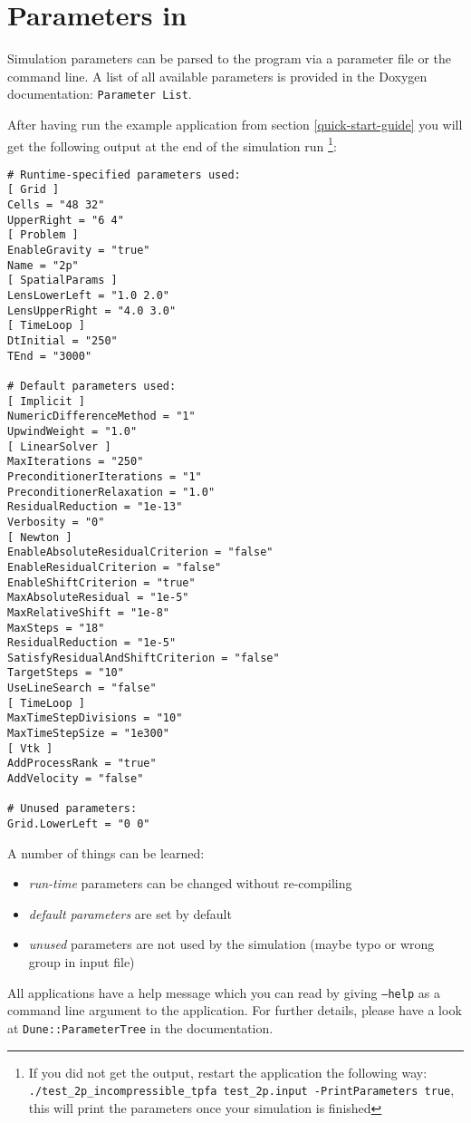 \section{Parameters in \Dumux}
\label{sc_parameterfiles}
Simulation parameters can be parsed to the program via a parameter file or the command line.
A list of all available parameters is provided in the Doxygen documentation: \texttt{Parameter List}.

After having run the example application from section \ref{quick-start-guide} you will
get the following output at the end of the simulation run
\footnote{If you did not get the output, restart the application the following way:
\texttt{./test{\_}2p{\_}incompressible{\_}tpfa test{\_}2p.input -PrintParameters true},
this will print the parameters once your simulation is finished}:
\begin{lstlisting}[style=Bash]
# Runtime-specified parameters used:
[ Grid ]
Cells = "48 32"
UpperRight = "6 4"
[ Problem ]
EnableGravity = "true"
Name = "2p"
[ SpatialParams ]
LensLowerLeft = "1.0 2.0"
LensUpperRight = "4.0 3.0"
[ TimeLoop ]
DtInitial = "250"
TEnd = "3000"

# Default parameters used:
[ Implicit ]
NumericDifferenceMethod = "1"
UpwindWeight = "1.0"
[ LinearSolver ]
MaxIterations = "250"
PreconditionerIterations = "1"
PreconditionerRelaxation = "1.0"
ResidualReduction = "1e-13"
Verbosity = "0"
[ Newton ]
EnableAbsoluteResidualCriterion = "false"
EnableResidualCriterion = "false"
EnableShiftCriterion = "true"
MaxAbsoluteResidual = "1e-5"
MaxRelativeShift = "1e-8"
MaxSteps = "18"
ResidualReduction = "1e-5"
SatisfyResidualAndShiftCriterion = "false"
TargetSteps = "10"
UseLineSearch = "false"
[ TimeLoop ]
MaxTimeStepDivisions = "10"
MaxTimeStepSize = "1e300"
[ Vtk ]
AddProcessRank = "true"
AddVelocity = "false"

# Unused parameters:
Grid.LowerLeft = "0 0"
\end{lstlisting}

A number of things can be learned:
\begin{itemize}
  \item \emph{run-time} parameters can be changed without re-compiling
  \item \emph{default parameters} are set by default
  \item \emph{unused} parameters are not used by the simulation (maybe typo or wrong group in input file)
\end{itemize}

All applications have a help message which you can read by giving
\texttt{--help} as a command line argument to the application.
For further details, please have a look at \texttt{Dune::ParameterTree}
in the \Dune documentation.
